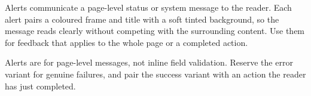 
Alerts communicate a page-level status or system message to the reader. Each alert pairs a
coloured frame and title with a soft tinted background, so the message reads clearly without
competing with the surrounding content. Use them for feedback that applies to the whole page or
a completed action.

\vspace{2mm}


\vspace{1mm}


\vspace{2mm}


\vspace{2mm}


\vspace{2mm}


\vspace{3mm}

{\small\color{muted} Alerts are for page-level messages, not inline field validation. Reserve the
error variant for genuine failures, and pair the success variant with an action the reader has
just completed.}

\clearpage

